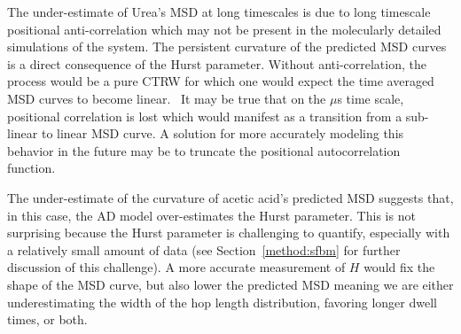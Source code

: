 \documentclass[12pt]{article}
\begin{document}
  The under-estimate of Urea's MSD at long timescales is due to long timescale
  positional anti-correlation which may not be present in the molecularly 
  detailed simulations of the system. The 
  persistent curvature of the predicted MSD curves is a direct consequence of 
  the Hurst parameter. Without anti-correlation, the process would be 
  a pure CTRW for which one would expect the time averaged MSD curves to become 
  linear.~\cite{meroz_toolbox_2015} It may be true that on the $\mu$s time scale, 
  positional correlation is lost which would manifest as a transition from a sub-linear
  to linear MSD curve. A solution for more accurately modeling this behavior in  
  the future may be to truncate the positional autocorrelation function.~\cite{molina-garcia_crossover_2018}
  
  The under-estimate of the curvature of acetic acid's predicted MSD suggests that,
  in this case, the AD model over-estimates the Hurst parameter. This is not surprising
  because the Hurst parameter is challenging to quantify, especially with a relatively 
  small amount of data (see Section~\ref{method:sfbm} for further discussion of this 
  challenge). A more accurate measurement of $H$ would fix the shape of the MSD curve,
  but also lower the predicted MSD meaning we are either underestimating the width of
  the hop length distribution, favoring longer dwell times, or both.
  
  
  
  
\end{document}
